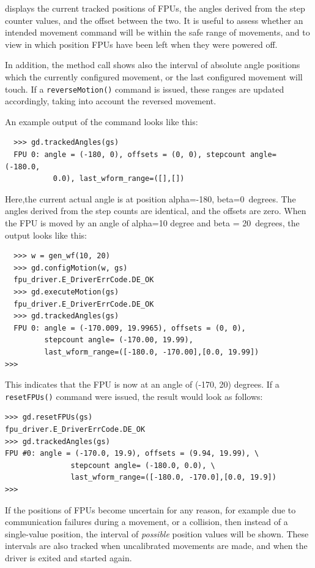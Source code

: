 \documentclass[11pt,a4paper]{scrartcl}
\begin{document}
displays the current tracked positions of FPUs, 
the angles derived from the step counter values, and the
offset between the two. It is useful to assess whether
an intended movement command will be within the safe range
of movements, and to view  in which position FPUs have
been left when they were powered off.

In addition, the method call shows also the interval of absolute angle
positions which the currently configured movement, or the last
configured movement will touch. If a \texttt{reverseMotion()} command
is issued, these ranges are updated accordingly, taking into account
the reversed movement.

An example output of the command looks like this:

\begin{verbatim}
  >>> gd.trackedAngles(gs)
  FPU 0: angle = (-180, 0), offsets = (0, 0), stepcount angle= (-180.0,
           0.0), last_wform_range=([],[])
\end{verbatim}

Here,the current actual angle is at position alpha=-180\degree, beta=0\degree\ 
degrees.  The angles derived from the step counts are identical, and
the offsets are zero. When the FPU is moved by an angle of alpha=10 degree
and beta = 20\degree\ degrees, the output looks like this:

\begin{verbatim}
  >>> w = gen_wf(10, 20)
  >>> gd.configMotion(w, gs)
  fpu_driver.E_DriverErrCode.DE_OK
  >>> gd.executeMotion(gs)
  fpu_driver.E_DriverErrCode.DE_OK
  >>> gd.trackedAngles(gs)
  FPU 0: angle = (-170.009, 19.9965), offsets = (0, 0), 
         stepcount angle= (-170.00, 19.99), 
         last_wform_range=([-180.0, -170.00],[0.0, 19.99])
>>>
\end{verbatim}

This indicates that the FPU is now at an angle of (-170, 20) degrees.
If a \texttt{resetFPUs()} command were issued, the result would
look as follows:


\begin{verbatim}
>>> gd.resetFPUs(gs)
fpu_driver.E_DriverErrCode.DE_OK
>>> gd.trackedAngles(gs)
FPU #0: angle = (-170.0, 19.9), offsets = (9.94, 19.99), \
               stepcount angle= (-180.0, 0.0), \
               last_wform_range=([-180.0, -170.0],[0.0, 19.9])
>>>
\end{verbatim}


If the positions of FPUs become uncertain for any reason, for example
due to communication failures during a movement, or a collision, then
instead of a single-value position, the interval of \emph{possible}
position values will be shown.  These intervals are also tracked when
uncalibrated movements are made, and when the driver is exited and
started again.
\end{document}
